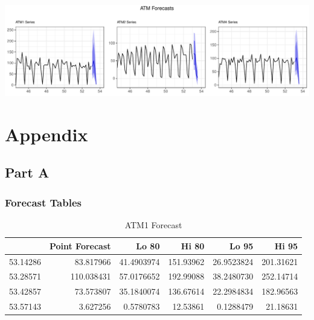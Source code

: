 \documentclass[openany]{book}
\begin{document}
\includegraphics{Part-A-JM_files/figure-latex/unnamed-chunk-7-1.pdf}

\hypertarget{Appendix}{%
\chapter*{Appendix}\label{Appendix}}

\hypertarget{Part-A}{%
\section*{Part A}\label{Part-A}}

\hypertarget{Part-A-FC}{%
\subsection*{Forecast Tables}\label{Part-A-FC}}

\begin{table}[H]

\caption{\label{tab:unnamed-chunk-8}ATM1 Forecast}
\centering
\begin{tabular}{l|r|r|r|r|r}
\hline
\textbf{ } & \textbf{Point Forecast} & \textbf{Lo 80} & \textbf{Hi 80} & \textbf{Lo 95} & \textbf{Hi 95}\\
\hline
\rowcolor{gray!6}  53.14286 & 83.817966 & 41.4903974 & 151.93962 & 26.9523824 & 201.31621\\
\hline
53.28571 & 110.038431 & 57.0176652 & 192.99088 & 38.2480730 & 252.14714\\
\hline
\rowcolor{gray!6}  53.42857 & 73.573807 & 35.1840074 & 136.67614 & 22.2984834 & 182.96563\\
\hline
53.57143 & 3.627256 & 0.5780783 & 12.53861 & 0.1288479 & 21.18631\\
\hline
\end{tabular}
\end{table}
\end{document}
